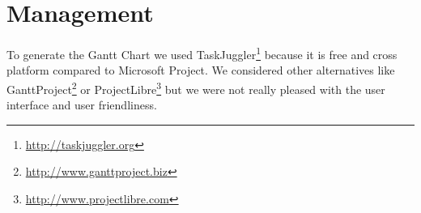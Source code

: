 \section{Management}

To generate the Gantt Chart we used
TaskJuggler\footnote{\url{http://taskjuggler.org}} because it is free and cross
platform compared to Microsoft Project. We considered other alternatives like
GanttProject\footnote{\url{http://www.ganttproject.biz}} or
ProjectLibre\footnote{\url{http://www.projectlibre.com}} but we were not really
pleased with the user interface and user friendliness.
